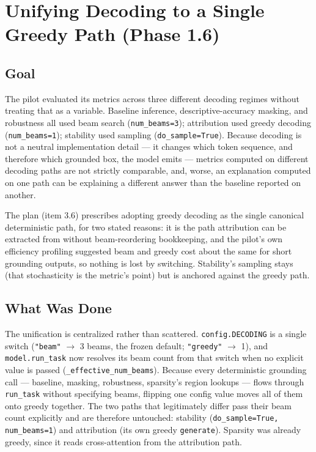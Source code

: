 \chapter{Unifying Decoding to a Single Greedy Path (Phase 1.6)}
\label{chap:p1-6}

\section{Goal}

The pilot evaluated its metrics across three different decoding regimes without treating that as a
variable. Baseline inference, descriptive-accuracy masking, and robustness all used beam search
(\texttt{num\_beams=3}); attribution used greedy decoding (\texttt{num\_beams=1}); stability used
sampling (\texttt{do\_sample=True}). Because decoding is not a neutral implementation detail --- it
changes which token sequence, and therefore which grounded box, the model emits --- metrics computed on
different decoding paths are not strictly comparable, and, worse, an explanation computed on one path
can be explaining a different answer than the baseline reported on another.

The plan (item 3.6) prescribes adopting greedy decoding as the single canonical deterministic path, for
two stated reasons: it is the path attribution can be extracted from without beam-reordering
bookkeeping, and the pilot's own efficiency profiling suggested beam and greedy cost about the same for
short grounding outputs, so nothing is lost by switching. Stability's sampling stays (that stochasticity
is the metric's point) but is anchored against the greedy path.

\section{What Was Done}

The unification is centralized rather than scattered. \texttt{config.DECODING} is a single switch
(\texttt{"beam"} $\rightarrow$ 3 beams, the frozen default; \texttt{"greedy"} $\rightarrow$ 1), and
\texttt{model.run\_task} now resolves its beam count from that switch when no explicit value is passed
(\texttt{\_effective\_num\_beams}). Because every deterministic grounding call --- baseline, masking,
robustness, sparsity's region lookups --- flows through \texttt{run\_task} without specifying beams,
flipping one config value moves all of them onto greedy together. The two paths that legitimately
differ pass their beam count explicitly and are therefore untouched: stability
(\texttt{do\_sample=True, num\_beams=1}) and attribution (its own greedy \texttt{generate}). Sparsity
was already greedy, since it reads cross-attention from the attribution path.

